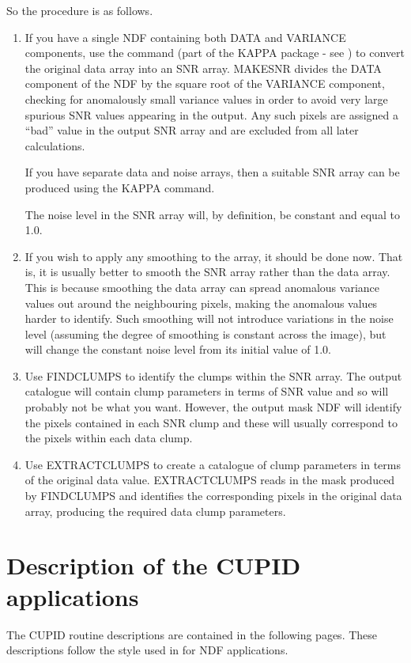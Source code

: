 \documentclass[twoside,11pt]{starlink}
\begin{document}
So the procedure is as follows.
\begin{enumerate}

\item If you have a single NDF containing both DATA and VARIANCE
components, use the  command (part of the
KAPPA package - see ) to convert the original data
array into an SNR array. MAKESNR divides the DATA component of the NDF by
the square root of the VARIANCE component, checking for anomalously small
variance values in order to avoid very large spurious SNR values appearing
in the output. Any such pixels are assigned a ``bad'' value in the output
SNR array and are excluded from all later calculations.

If you have separate data and noise arrays, then a suitable SNR array can
be produced using the KAPPA  command.

The noise level in the SNR array will, by definition, be constant and
equal to 1.0.

\item If you wish to apply any smoothing to the array, it should be done now.
That is, it is usually better to smooth the SNR array rather than the data
array. This is because smoothing the data array can spread anomalous
variance values out around the neighbouring pixels, making the anomalous
values harder to identify. Such smoothing will not introduce variations
in the noise level (assuming the degree of smoothing is constant across
the image), but will change the constant noise level from its initial
value of 1.0.

\item Use FINDCLUMPS to identify the clumps within the SNR array. The
output catalogue will contain clump parameters in terms of SNR value and
so will probably not be what you want. However, the output mask NDF will
identify the pixels contained in each SNR clump and these will usually
correspond to the pixels within each data clump.

\item Use EXTRACTCLUMPS to create a catalogue of clump parameters in
terms of the original data value. EXTRACTCLUMPS reads in the mask produced
by FINDCLUMPS and identifies the corresponding pixels in the original
data array, producing the required data clump parameters.

\end{enumerate}



\newpage
\appendix
\section{ \label{APP:DESCRIPTION}Description of the CUPID applications}


The CUPID routine descriptions are contained in the following pages.
These descriptions follow the style used in 
for NDF applications.


\newpage


\newpage
\end{document}
